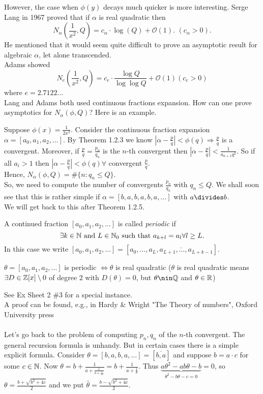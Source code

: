 \documentclass[NumTh.tex]{subfiles}
\begin{document}
However, the case when $\phi(y)$ decays much quicker is more interesting.
Serge Lang in 1967 proved that if $\alpha$ is real quadratic then
\[ N_\alpha(\frac{1}{x^2},Q) = c_\alpha \cdot \log(Q) + \mathcal{O}(1)\text{. } (c_\alpha > 0). \]
He mentioned that it would seem quite difficult to prove an asymptotic result for algebraic $\alpha$, let alone transcended.\\
Adams showed
\[ N_e(\frac{1}{x^2},Q) = c_e \cdot \frac{\log Q}{\log \log Q} + \mathcal{O}(1) (c_e > 0) \]
where $ e = 2.7122\dots$\\
Lang and Adams both used continuous fractions expansion. How can one prove asymptotics for $N_\alpha(\phi,Q)$?
Here is an example.

\begin{ex}
  Suppose $\phi(x) = \frac{1}{2x^2}$. Consider the continuous fraction expansion $\alpha = [a_0,a_1,a_2,\dots]$.
  By Theorem 1.2.3 we know $| \alpha - \frac{p}{q}| < \phi(q) \Rightarrow \frac{p}{q}$ is a convergent.
  Moreover, if $\frac{p}{q} = \frac{p_n}{q_n}$ is the $n$-th convergent then $|\alpha - \frac{p}{q}| < \frac{1}{a_{n+1} q^2}$.
  So if all $a_i > 1$ then $|\alpha - \frac{p}{q}| < \phi(q) \forall$ convergent $\frac{p}{q}$.\\
  Hence, $N_\alpha(\phi,Q) = \#\{n: q_n \leq Q \}$.\\
  So, we need to compute the number of convergents $\frac{p_n}{q_n}$ with $q_n \leq Q$. 
  We shall soon see that this is rather simple if $\alpha = [b,a,b,a,b,a,\dots]$ with $a \divides b$.\\
  We will get back to this after Theorem 1.2.5.
\end{ex}

A continued fraction $[a_0,a_1,a_2,\dots]$ is called \emph{periodic} if
\[ \exists k \in \mathbb{N}  \text{ and } L \in \mathbb{N}_0 \text{ such that } a_{k+l} = a_l \forall l \geq L.\]
In this case we write $[a_0,a_1,a_2,\dots] = [a_0,\dots,\overbar{a_L,a_{L+1},\dots,a_{L+k-1}}]$.

\begin{theorem}\label{1_2_4}
  $\theta = [a_0,a_1,a_2,\dots]$ is periodic $\iff \theta$ is real quadratic ($\theta$ is real quadratic means $\exists D \in \mathbb{Z}[x]\setminus 0$ of degree $2$ with $D(\theta) = 0$, but $\theta \nin \Q$ and $\theta \in \mathbb{R}$)
\end{theorem}

See Ex Sheet 2 \#3 for a special instance.\\
A proof can be found, e.g., in Hardy \& Wright "The Theory of numbers", Oxford University press\\
\\
Let's go back to the problem of computing  $p_n, q_n$ of the $n$-th convergent.
The general recursion formula is unhandy.
But in certain cases there is a simple explicit formula. 
Consider $\theta = [b,a,b,a,\dots] = [\overbar{b,a}]$ and suppose $b = a \cdot c$ for some $c \in \mathbb{N}$.
Now $\theta = b + \frac{1}{a + \frac{1}{b + \frac{1}{\dots}}} = b + \frac{1}{a + \frac{1}{\theta}}$.
Thus $\underbrace{a \theta^2 - ab\theta - b}_{\theta^2 - b\theta -c = 0} = 0$, so $\theta = \frac{b + \sqrt{b^2+4c}}{2}$
and we put $\bar{\theta} = \frac{b - \sqrt{b^2+4c}}{2}$.
\end{document}
